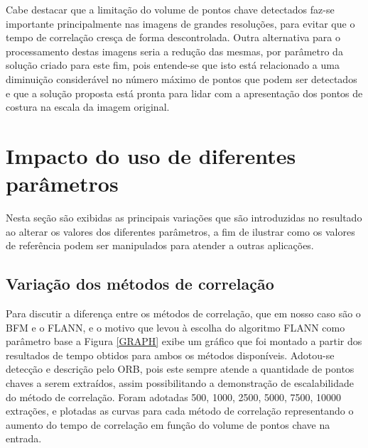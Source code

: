 Cabe destacar que a limitação do volume de pontos chave detectados faz-se importante principalmente nas imagens de grandes resoluções, para evitar que o tempo de correlação cresça de forma descontrolada. Outra alternativa para o processamento destas imagens seria a redução das mesmas, por parâmetro da solução criado para este fim, pois entende-se que isto está relacionado a uma diminuição considerável no número máximo de pontos que podem ser detectados e que a solução proposta está pronta para lidar com a apresentação dos pontos de costura na escala da imagem original. 


\section{Impacto do uso de diferentes parâmetros}

Nesta seção são exibidas as principais variações que são introduzidas no resultado ao alterar os valores dos diferentes parâmetros, a fim de ilustrar como os valores de referência podem ser manipulados para atender a outras aplicações.

\subsection{Variação dos métodos de correlação}

Para discutir a diferença entre os métodos de correlação, que em nosso caso são o BFM e o FLANN, e o motivo que levou à escolha do algoritmo FLANN como parâmetro base a Figura \ref{GRAPH} exibe um gráfico que foi montado a partir dos resultados de tempo obtidos para ambos os métodos disponíveis. Adotou-se detecção e descrição pelo ORB, pois este sempre atende a quantidade de pontos chaves a serem extraídos, assim possibilitando a demonstração de escalabilidade do método de correlação. Foram adotadas 500, 1000, 2500, 5000, 7500, 10000 extrações, e plotadas as curvas para cada método de correlação representando o aumento do tempo de correlação em função do volume de pontos chave na entrada. 

